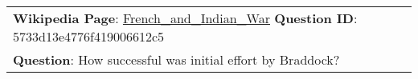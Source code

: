 \begin{figure*}[ht]
{\begin{tabular}{p{}}
            \textbf{Wikipedia Page}: \underline{French\_and\_Indian\_War} \textbf{Question ID}: 5733d13e4776f419006612c5                                                                                                                                                                                                                                                                                                                                                                                                                                                                                                                                                                                                                                                                                                                                                                                                                                                                                                                                                                                                                            \\
            \textbf{Question}: How successful was initial effort by Braddock?                                                                                                                                                                                                                                                                                                                                                                                                                                                                                                                                                                                                                                                                                                                                                                                                                                                                                                                                                                                                                                                                       \\

\end{tabular}}
\end{figure*}
